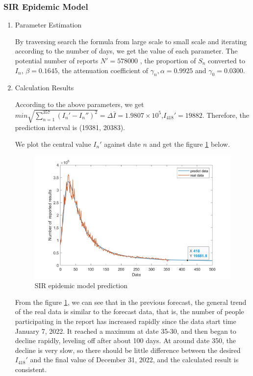 \documentclass[
  journal=medium,
  manuscript=Report,
  year=2023,
  volume=37,
]{cup-journal}
\begin{document}
\subsubsection{SIR Epidemic Model}
\begin{enumerate}
    \item Parameter Estimation
    
    By traversing search the formula from large scale to small scale and iterating according to the number of days, we get the value of each parameter. The potential number of reports $N' = 578000$ , the proportion of $S_n$ converted to $I_n$, $\beta = 0.1645$, the attenuation coefficient of $\gamma_n, \alpha = 0.9925$ and $\gamma_0 = 0.0300$.
    \item Calculation Results 
    
    According to the above parameters, we get $min \sqrt{\sum_{n=1}^{357}(I_n'-I_n'')^2} = \Delta \overline{I} = 1.9807 \times 10^5$,$I_{418}' = 19882$. Therefore, the prediction interval is (19381, 20383). 
    
    We plot the central value $I_n'$ against date $n$ and get the figure \ref{SIR real} below. 
    
    \begin{figure}[hbt!]
        \centering
        \includegraphics[width=0.7\linewidth]{pic/SIR_real.jpg}
        \caption{SIR epidemic model prediction}
        \label{SIR real}
    \end{figure}

    From the figure \ref{SIR real}, we can see that in the previous forecast, the general trend of the real data is similar to the forecast data, that is, the number of people participating in the report has increased rapidly since the data start time January 7, 2022. It reached a maximum at date 35-30, and then began to decline rapidly, leveling off after about 100 days. At around date 350, the decline is very slow, so there should be little difference between the desired $I_{418}'$ and the final value of December 31, 2022, and the calculated result is consistent. 
\end{enumerate}
\end{document}
